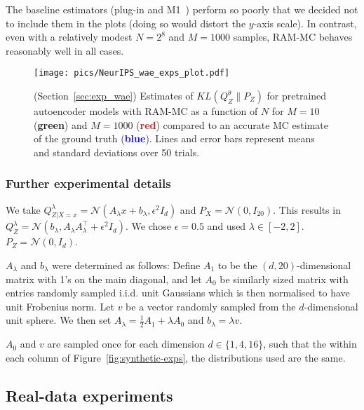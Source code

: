 The baseline estimators (plug-in \cite{moon14ensemble} and M1~\cite{nguyen10ratio}) perform so poorly that we decided not to include them in the plots (doing so would distort the $y$-axis scale).
In contrast, even with a relatively modest $N{=}2^8$ and $M{=}1000$ samples, RAM-MC behaves reasonably well in all cases.

\begin{figure}
\begin{center}
\texttt{[image: pics/NeurIPS\_wae\_exps\_plot.pdf]}
\end{center}
\caption{\label{fig:real-exps}
(Section~\ref{sec:exp_wae}) Estimates of $KL(Q_Z^\theta \| P_Z)$ for pretrained autoencoder models with RAM-MC as a function of $N$ for $M{=}10$ ({\bf \textcolor{green!65!blue}{green}}) and $M{=}1000$ ({\bf \textcolor{red}{red}}) compared to an accurate MC estimate of the ground truth ({\bf\textcolor{blue}{blue}}).
Lines and error bars represent means and standard deviations over 50 trials.
}
\end{figure}


\subsubsection{Further experimental details}

We take $Q^\lambda_{Z|X=x} = \mathcal{N}\left(A_\lambda x + b_\lambda, \epsilon^2 I_d \right)$ and $P_X = \mathcal{N}\left(0, I_{20} \right)$.
This results in $Q^\lambda_Z = \mathcal{N}\left(b_\lambda,  A_\lambda A_\lambda^\intercal + \epsilon^2 I_d \right)$. We chose $\epsilon=0.5$ and used $\lambda \in [-2,2]$. $P_Z = \mathcal{N}(0, I_d)$.

$A_\lambda$ and $b_\lambda$ were determined as follows:
Define $A_1$ to be the $(d, 20)$-dimensional matrix with 1's on the main diagonal, and let $A_0$ be similarly sized matrix with entries randomly sampled i.i.d.\: unit Gaussians which is then normalised to have unit Frobenius norm. 
Let $v$ be a vector randomly sampled from the $d$-dimensional unit sphere.
We then set
$A_\lambda=\frac{1}{2} A_1 + \lambda A_0$ and $b_\lambda= \lambda v$.

$A_0$ and $v$ are sampled once for each dimension $d{\in}\{1,4,16\}$, such that the within each column of Figure~\ref{fig:synthetic-exps}, the distributions used are the same.







\subsection{Real-data experiments}\label{appendix:real-data-experiments-additional}

